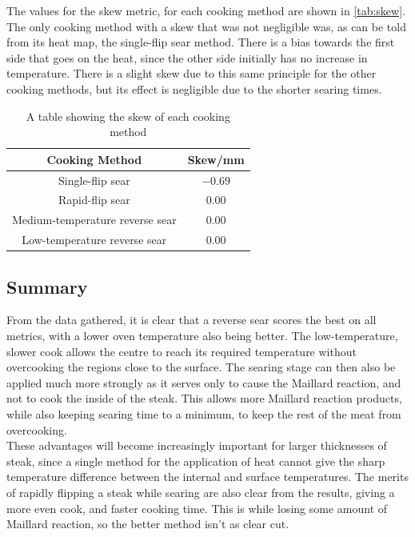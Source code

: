 \documentclass[11pt]{article}
\begin{document}
	The values for the skew metric, for each cooking method are shown in \autoref{tab:skew}. The only cooking method with a skew that was not negligible was, as can be told from its heat map, the single-flip sear method. There is a bias towards the first side that goes on the heat, since the other side initially has no increase in temperature. There is a slight skew due to this same principle for the other cooking methods, but its effect is negligible due to the shorter searing times.
	
	\begin{table}[H]
		\centering
		\begin{tabular}{c|c}
			\textbf{Cooking Method} & \textbf{Skew}/mm \\
			\hline
			Single-flip sear & $-0.69$ \\
			Rapid-flip sear & 0.00 \\
			Medium-temperature reverse sear & 0.00 \\
			Low-temperature reverse sear & 0.00
		\end{tabular}
		\caption{A table showing the skew of each cooking method}
		\label{tab:skew}
	\end{table}
	
	\subsection{Summary}
	
	From the data gathered, it is clear that a reverse sear scores the best on all metrics, with a lower oven temperature also being better. The low-temperature, slower cook allows the centre to reach its required temperature without overcooking the regions close to the surface. The searing stage can then also be applied much more strongly as it serves only to cause the Maillard reaction, and not to cook the inside of the steak. This allows more Maillard reaction products, while also keeping searing time to a minimum, to keep the rest of the meat from overcooking.\\
	
	These advantages will become increasingly important for larger thicknesses of steak, since a single method for the application of heat cannot give the sharp temperature difference between the internal and surface temperatures. The merits of rapidly flipping a steak while searing are also clear from the results, giving a more even cook, and faster cooking time. This is while losing some amount of Maillard reaction, so the better method isn't as clear cut.
	
\end{document}
